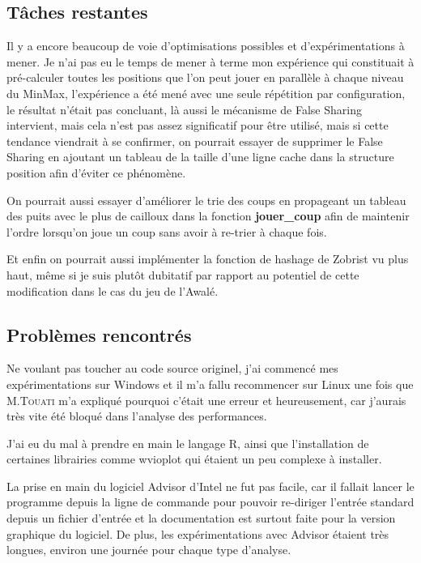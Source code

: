 \documentclass[
 aip,
 jmp,
 amsmath,amssymb,
 reprint
]{revtex4-1}
\begin{document}
\subsection{Tâches restantes}
Il y a encore beaucoup de voie d'optimisations possibles et d'expérimentations à mener. Je n'ai pas eu le temps de mener à terme mon expérience qui constituait à pré-calculer toutes les positions que l'on peut jouer en parallèle à chaque niveau du MinMax\pageref{Fig:alpha_beta}, l'expérience a été mené avec une seule répétition par configuration, le résultat n'était pas concluant, là aussi le mécanisme de False Sharing\pageref{Fig:false_sharing} intervient, mais cela n'est pas assez significatif pour être utilisé, mais si cette tendance viendrait à se confirmer, on pourrait essayer de supprimer le False Sharing\pageref{Fig:false_sharing} en ajoutant un tableau de la taille d'une ligne cache dans la structure position afin d'éviter ce phénomène.\par
On pourrait aussi essayer d'améliorer le trie des coups en propageant un tableau des puits avec le plus de cailloux dans la fonction \textbf{jouer\_coup} afin de maintenir l'ordre lorsqu'on joue un coup sans avoir à re-trier à chaque fois.\par
Et enfin on pourrait aussi implémenter la fonction de hashage de Zobrist vu plus haut, même si je suis plutôt dubitatif par rapport au potentiel de cette modification dans le cas du jeu de l'Awalé\pageref{Fig:awale}.

\subsection{Problèmes rencontrés}
Ne voulant pas toucher au code source originel, j'ai commencé mes expérimentations sur Windows et il m'a fallu recommencer sur Linux une fois que M.\textsc{Touati} m'a expliqué pourquoi c'était une erreur et heureusement, car j'aurais très vite été bloqué dans l'analyse des performances.\par
J'ai eu du mal à prendre en main le langage R, ainsi que l'installation de certaines librairies comme wvioplot qui étaient un peu complexe à installer.\par
La prise en main du logiciel Advisor d'Intel ne fut pas facile, car il fallait lancer le programme depuis la ligne de commande pour pouvoir re-diriger l'entrée standard depuis un fichier d'entrée et la documentation est surtout faite pour la version graphique du logiciel. De plus, les expérimentations avec Advisor étaient très longues, environ une journée pour chaque type d'analyse.
\clearpage
\end{document}
